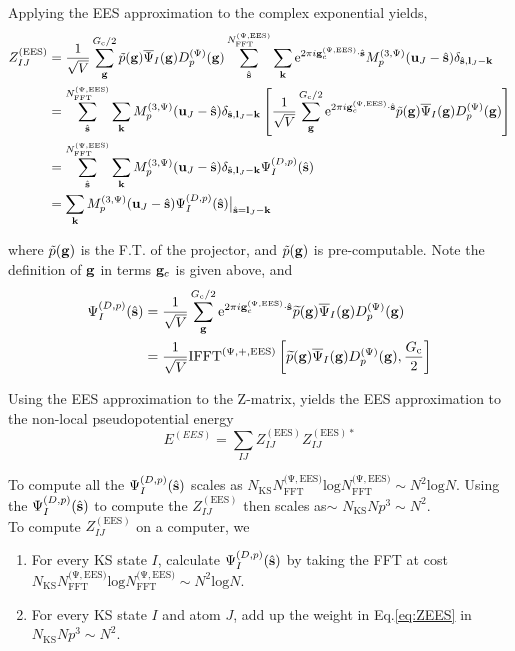 \documentclass[paper=a4, fontsize=11pt]{article} %
\numberwithin{equation}{section} %
\numberwithin{figure}{section} %
\numberwithin{table}{section} %
\newcommand{\wt}{\widetilde}
\newcommand{\ol}{\overline}
\newcommand{\bu}{{\bf{u}}}
\newcommand{\bl}{{\bf{l}}}
\newcommand{\bk}{{\bf{k}}}
\newcommand{\bs}{{\bf{s}}}
\newcommand{\bg}{{\bf{g}}}
\newcommand{\rEES}{{\mathrm{EES}}}
\newcommand{\re}{{\mathrm{e}}}
\newcommand{\rl}{{\mathrm{log}}}
\newcommand{\gcpEES}{{\bg_c^{(\Psi,\rEES)}}}
\newcommand{\NFFTpEES}{{N^{\mathrm{(\Psi,\rEES})}_{\mathrm{FFT}}}}
\newcommand{\Gc}{{G_{\mathrm{c}}}}
\newcommand{\hGc}{{\frac{G_{\mathrm{c}}}{2}}}
\newcommand{\Dpg}{{D^{(\Psi)}_p(\bg)}}
\newcommand{\Mp}{{M_p^{(3,\Psi)}}}
\newcommand{\IFFTpEES}{{\mathrm{IFFT}^{(\Psi,+,\rEES)}}}
\begin{document}
Applying the EES approximation to the complex exponential yields,
\begin{equation}\label{eq:ZEES}
\begin{split}
Z_{IJ}^{(\rEES)}
& = \frac{1}{\sqrt{V}}\sum_\bg^{\Gc/2} \tilde p (\bg) \ol \Psi_I(\bg) \Dpg\sum_{\hat \bs}^\NFFTpEES \sum_{\bk} \re^{2\pi i\gcpEES \cdot \hat\bs} \Mp(\bu_{J}-\hat \bs)\delta_{\hat \bs,\bl_J-\bk} \\
& = \sum_{\hat \bs}^\NFFTpEES  \sum_{\bk} \Mp(\bu_{J}-\hat \bs)\delta_{\hat \bs,\bl_J-\bk} \left[\frac{1}{\sqrt{V}}\sum_\bg^{\Gc/2} \re^{2\pi i\gcpEES \cdot \hat\bs} \tilde p (\bg) \ol \Psi_I(\bg) \Dpg \right]\\
& = \sum_{\hat \bs}^\NFFTpEES  \sum_{\bk} \Mp(\bu_{J}-\hat \bs)\delta_{\hat \bs,\bl_J-\bk} \Psi_I^{(D,p)}(\hat \bs)\\
&=  \sum_{\bk} \Mp(\bu_{J}-\hat \bs) \Psi_I^{(D,p)}(\hat \bs) \big|_{\hat \bs =\bl_J-\bk}\\
\end{split}
\end{equation}


where $\tilde {p}(\bg)$ is the F.T. of the projector, and $\tilde {p} (\bg)$ is pre-computable. Note the definition of $\bg$ in terms $\bg_c$ is given above, and
\begin{equation}
\begin{split}
\Psi_I^{(D,p)}(\hat \bs)
&= \frac{1}{\sqrt{V}}\sum_\bg^{\Gc/2} \re^{2\pi i\gcpEES \cdot \hat\bs} \wt p (\bg) \ol \Psi_I(\bg) \Dpg\\
&=  \frac{1}{\sqrt{V}} \IFFTpEES \left[\wt p (\bg) \ol \Psi_I(\bg) \Dpg,\hGc\right]
\end{split}
\end{equation}


Using the EES approximation to the Z-matrix, yields the EES approximation to the non-local pseudopotential energy
\begin{equation}
   E^{(EES)} = \sum_{IJ} Z_{IJ}^{(\rEES)}Z_{IJ}^{(\rEES)*}
\end{equation}

To compute all the $\Psi_I^{(D,p)}(\hat \bs)$ scales as $N_{\mathrm{KS}}\NFFTpEES\rl \NFFTpEES\sim N^2\rl N$. Using the $\Psi_I^{(D,p)}(\hat \bs)$ to compute the $Z_{IJ}^{(\rEES)}$ then scales as$\sim$ $N_{\mathrm{KS}}N p^3 \sim N^2$. \\

To compute $Z_{IJ}^{(\rEES)}$ on a computer, we
\begin{enumerate}
\item For every KS state $I$, calculate $\Psi_I^{(D,p)}(\hat \bs)$ by taking the FFT at cost $N_{\mathrm{KS}}\NFFTpEES\rl \NFFTpEES\sim N^2\rl N$.
\item For every KS state $I$ and atom $J$, add up the weight in Eq.\eqref{eq:ZEES} in $N_{\mathrm{KS}}N p^3 \sim N^2$.
\end{enumerate}
\end{document}
